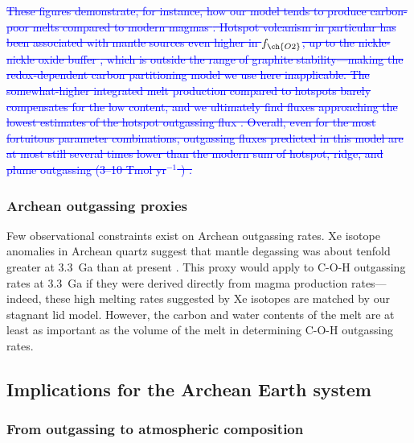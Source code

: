 \documentclass[3p,authoryear]{elsarticle}
\newcommand{\editthree}[2]{\textcolor{blue}{\sout{#1}#2}}
\begin{document}
\editthree{These figures demonstrate, for instance, how our model tends to produce carbon-poor melts compared to modern magmas \citep{Hauri2019}. Hotspot volcanism in particular has been associated with mantle sources even higher in $f_{\ch{O2}}$, up to the nickle-nickle oxide buffer \citep[e.g.,][]{AMUNDSEN1992, MOUSSALLAM2016}, which is outside the range of graphite stability---making the redox-dependent carbon partitioning model we use here inapplicable. The somewhat-higher integrated melt production compared to hotspots \citep{Mjelde2010} barely compensates for the low \ch{CO2} content, and we ultimately find \ch{CO2} fluxes approaching the lowest estimates of the hotspot outgassing flux \citep{DASGUPTA2010, Hauri2019}. Overall, even for the most fortuitous parameter combinations, outgassing fluxes predicted in this model are at most still several times lower than the modern sum of hotspot, ridge, and plume outgassing (3--10 Tmol yr$^{-1}$ \ch{CO2}) \citep{Gerlach2011}.}{}


\subsubsection{Archean outgassing proxies}

Few observational constraints exist on Archean outgassing rates. Xe isotope anomalies in Archean quartz suggest that mantle degassing was about tenfold greater at 3.3~Ga than at present \citep{Avice2017, martyGeochemicalEvidenceHigh2019}. This proxy would apply to C-O-H outgassing rates at 3.3~Ga if they were derived directly from magma production rates---indeed, these high melting rates suggested by Xe isotopes are matched by our stagnant lid model. However, the carbon and water contents of the melt are at least as important as the volume of the melt in determining C-O-H outgassing rates. 


\subsection{Implications for the Archean Earth system}\label{sec:implications}

\subsubsection{From outgassing to atmospheric composition}
\label{sec:atmosphere-discussion}
\end{document}
